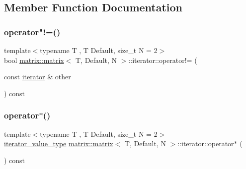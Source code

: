 \subsection{Member Function Documentation}
\mbox{\label{structmatrix_1_1matrix_1_1iterator_a4f8dfb7ac8e333ef7cd3e2d2de18c365}} 
\subsubsection{\texorpdfstring{operator"!=()}{operator!=()}}
{\footnotesize\ttfamily template$<$typename T , T Default, size\+\_\+t N = 2$>$ \\
bool \hyperlink{structmatrix_1_1matrix}{matrix\+::matrix}$<$ T, Default, N $>$\+::iterator\+::operator!= (\begin{DoxyParamCaption}\item[{const \hyperlink{structmatrix_1_1matrix_1_1iterator}{iterator} \&}]{other }\end{DoxyParamCaption}) const\hspace{0.3cm}{\ttfamily [inline]}}

\mbox{\label{structmatrix_1_1matrix_1_1iterator_a6f170a1d6e7272725ab70fda22c8d8b6}} 
\subsubsection{\texorpdfstring{operator$\ast$()}{operator*()}}
{\footnotesize\ttfamily template$<$typename T , T Default, size\+\_\+t N = 2$>$ \\
\hyperlink{structmatrix_1_1matrix_a1de5c69f5d9e3b6d3e54b1e4cb433d65}{iterator\+\_\+value\+\_\+type} \hyperlink{structmatrix_1_1matrix}{matrix\+::matrix}$<$ T, Default, N $>$\+::iterator\+::operator$\ast$ (\begin{DoxyParamCaption}{ }\end{DoxyParamCaption}) const\hspace{0.3cm}{\ttfamily [inline]}}

\mbox{\label{structmatrix_1_1matrix_1_1iterator_af3a7da3dc2ebe100f800001706eca436}} 
